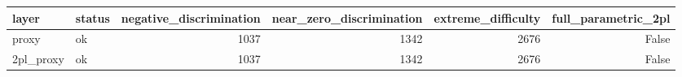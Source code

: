 \begin{tabular}{llrrrr}
\toprule
layer & status & negative\_discrimination & near\_zero\_discrimination & extreme\_difficulty & full\_parametric\_2pl \\
\midrule
proxy & ok & 1037 & 1342 & 2676 & False \\
2pl\_proxy & ok & 1037 & 1342 & 2676 & False \\
\bottomrule
\end{tabular}
